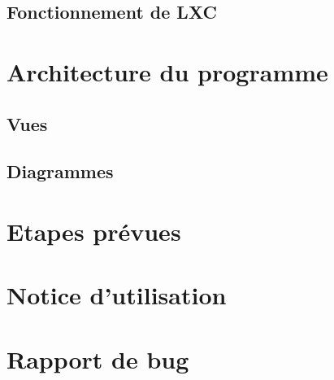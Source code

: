 \documentclass[a4paper]{article}
\begin{document}
\subsection{Fonctionnement de LXC}


\section{Architecture du programme}
\subsection{Vues}
\subsection{Diagrammes}


\section{Etapes pr\'evues}


\section{Notice d'utilisation}

\section{Rapport de bug}
\end{document}
